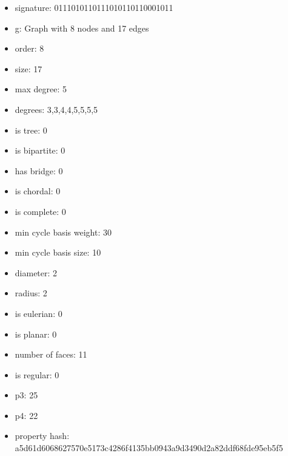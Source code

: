 \begin{itemize}
\item signature: 0111010110111010110110001011
\item g: Graph with 8 nodes and 17 edges
\item order: 8
\item size: 17
\item max degree: 5
\item degrees: 3,3,4,4,5,5,5,5
\item is tree: 0
\item is bipartite: 0
\item has bridge: 0
\item is chordal: 0
\item is complete: 0
\item min cycle basis weight: 30
\item min cycle basis size: 10
\item diameter: 2
\item radius: 2
\item is eulerian: 0
\item is planar: 0
\item number of faces: 11
\item is regular: 0
\item p3: 25
\item p4: 22
\item property hash: a5d61d6068627570e5173c4286f4135bb0943a9d3490d2a82ddf68fde95eb5f5
\end{itemize}
\newpage
\begin{figure}
\end{figure}
